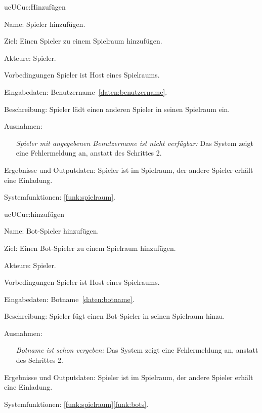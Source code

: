 \begin{description}[leftmargin=5em, style=sameline]
	\begin{lhp}{uc}{UC}{uc:Hinzufügen}
		\item [Name:] Spieler hinzufügen.
		\item [Ziel:] Einen Spieler zu einem Spielraum hinzufügen.
		\item [Akteure:] Spieler.
		\item [Vorbedingungen] Spieler ist Host eines Spielraums.
		\item [Eingabedaten:] Benutzername~\ref{daten:benutzername}.
		\item [Beschreibung:] Spieler lädt einen anderen Spieler in seinen Spielraum ein.
		\item [Ausnahmen:] \hfill
			\begin{itemize} 
				\item[] \textit{Spieler mit angegebenen Benutzername ist nicht verfügbar:} Das System zeigt eine Fehlermeldung an, anstatt des Schrittes 2.
				
			\end{itemize}
		\item [Ergebnisse und Outputdaten:] Spieler ist im Spielraum, der andere Spieler erhält eine Einladung.	
		\item [Systemfunktionen:] \ref{funk:spielraum}.
	\end{lhp}
	
	\begin{lhp}{uc}{UC}{uc:hinzufügen}
		\item [Name:] Bot-Spieler hinzufügen.
		\item [Ziel:] Einen Bot-Spieler zu einem Spielraum hinzufügen.
		\item [Akteure:] Spieler.
		\item [Vorbedingungen] Spieler ist Host eines Spielraums.
		\item [Eingabedaten:] Botname~\ref{daten:botname}.
		\item [Beschreibung:] Spieler fügt einen Bot-Spieler in seinen Spielraum hinzu.
		\item [Ausnahmen:] \hfill
			\begin{itemize} 
				\item[] \textit{Botname ist schon vergeben:} Das System zeigt eine Fehlermeldung an, anstatt des Schrittes 2.
				
			\end{itemize}
		\item [Ergebnisse und Outputdaten:] Spieler ist im Spielraum, der andere Spieler erhält eine Einladung.	
		\item [Systemfunktionen:] \ref{funk:spielraum}\ref{funk:bots}.
	\end{lhp}
	

\end{description}
